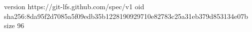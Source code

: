 version https://git-lfs.github.com/spec/v1
oid sha256:8da95f2d7085a5f09edb35b1228190929710e82783c25a31eb379d853134e07b
size 96
